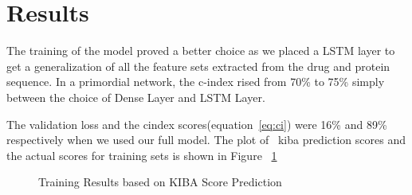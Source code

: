 \section{Results}
The training of the model proved a better choice as we placed a LSTM layer to get a generalization of all the feature sets extracted from the drug and protein sequence. In a primordial network, the c-index rised from 70\% to 75\% simply between the choice of Dense Layer and LSTM Layer. 

The validation loss and the cindex scores(equation~\ref{eq:ci}) were 16\% and 89\% respectively when we used our full model. The plot of ~\acrshort{kiba} prediction scores and the actual scores for training sets is shown in Figure ~\ref{fig:pred_train}
\begin{figure}[ht]
    \caption{Training Results based on KIBA Score Prediction}
    \label{fig:pred_train}
\end{figure}

